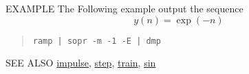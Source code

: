 \begin{options}
\end{options}

\begin{qsection}{EXAMPLE}
The Following example output the sequence 
\begin{displaymath}
  y(n)=\exp(-n)
\end{displaymath}
\begin{quote}
\verb!ramp | sopr -m -1 -E | dmp!
\end{quote}
\end{qsection}

\begin{qsection}{SEE ALSO}
\hyperlink{impulse}{impulse},
\hyperlink{step}{step},
\hyperlink{train}{train},
\hyperlink{sin}{sin}
\end{qsection}
